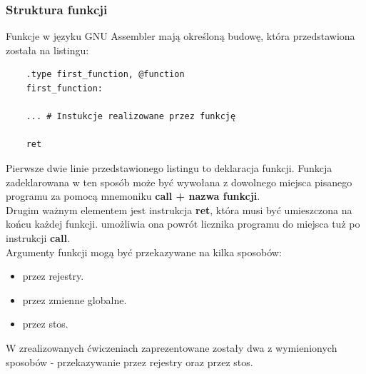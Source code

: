 \documentclass[a4paper,12pt]{article}
\begin{document}
\subsubsection{Struktura funkcji}
Funkcje w języku GNU Assembler mają określoną budowę, która przedstawiona została na listingu:
\begin{verbatim}
	.type first_function, @function
	first_function:
	
	... # Instukcje realizowane przez funkcję
	
	ret
\end{verbatim}
Pierwsze dwie linie przedstawionego listingu to deklaracja funkcji. Funkcja zadeklarowana w ten sposób może być wywołana z dowolnego miejsca pisanego programu za pomocą mnemoniku \textbf{call + nazwa funkcji}.\\
Drugim ważnym elementem jest instrukcja \textbf{ret}, która musi być umieszczona na końcu każdej funkcji. umożliwia ona powrót licznika programu do miejsca tuż po instrukcji \textbf{call}.\\
Argumenty funkcji mogą być przekazywane na kilka sposobów:
\begin{itemize}
	\item przez rejestry.
	\item przez zmienne globalne.
	\item przez stos.
\end{itemize}
W zrealizowanych ćwiczeniach zaprezentowane zostały dwa z wymienionych sposobów - przekazywanie przez rejestry oraz przez stos.
\end{document}
